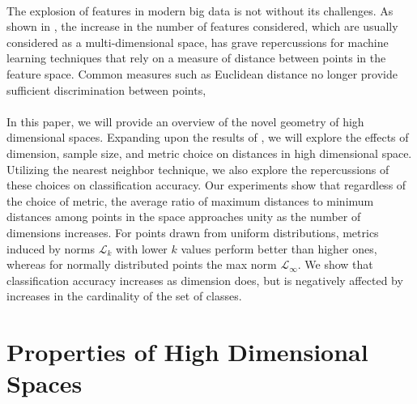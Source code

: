 \documentclass{article}
\begin{document}
\paragraph{}
The explosion of features in modern big data is not without its challenges.  As shown in \cite{aggarwal2001surprising}, the increase in the number of features considered, which are usually considered as a multi-dimensional space, has grave repercussions for machine learning techniques that rely on a measure of distance between points in the feature space. Common measures such as Euclidean distance no longer provide sufficient discrimination between points,
\paragraph{}
In this paper, we will provide an overview of the novel geometry of high dimensional spaces. Expanding upon the results of \cite{aggarwal2001surprising}, we will explore the effects of dimension, sample size, and metric choice on distances in high dimensional space. Utilizing the nearest neighbor technique, we also explore the repercussions of these choices on classification accuracy. Our experiments show that regardless of the choice of metric, the average ratio of maximum distances to minimum distances among points in the space approaches unity as the number of dimensions increases. For points drawn from uniform distributions, metrics induced by norms $\mathcal{L}_k$ with lower $k$ values perform better than higher ones, whereas for normally distributed points the max norm  $\mathcal{L}_{\infty}$. We show that classification accuracy increases as dimension does, but is negatively affected by increases in the cardinality of the set of classes.

\section{Properties of High Dimensional Spaces}
\end{document}
